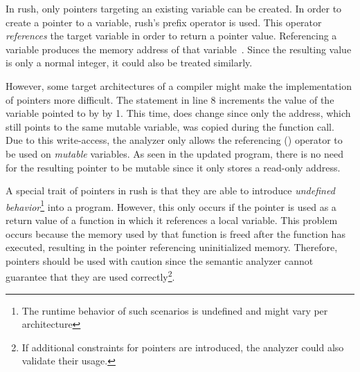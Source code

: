 In rush, only pointers targeting an existing variable can be created.
In order to create a pointer to a variable, rush's \qVerb{&} prefix operator is used.
This operator \emph{references} the target variable in order to return a pointer value.
Referencing a variable produces the memory address of that variable~\cite[p.~95]{Ritchie1988}.
Since the resulting value is only a normal integer, it could also be treated similarly.

However, some target architectures of a compiler might make the implementation of pointers more difficult.
The statement in line 8 increments the value of the variable pointed to by  by 1.
This time,  does change since only the address, which still points to the same mutable variable, was copied during the function call.
Due to this write-access, the analyzer only allows the referencing (\qVerb{&}) operator to be used on \emph{mutable} variables.
As seen in the updated program, there is no need for the resulting pointer to be mutable since it only stores a read-only address.

A special trait of pointers in rush is that they are able to introduce \emph{undefined behavior}\footnote{The runtime behavior of such scenarios is undefined and might vary per architecture} into a program.
However, this only occurs if the pointer is used as a return value of a function in which it references a local variable.
This problem occurs because the memory used by that function is freed after the function has executed, resulting in the pointer referencing uninitialized memory.
Therefore, pointers should be used with caution since the semantic analyzer cannot guarantee that they are used correctly\footnote{If additional constraints for pointers are introduced, the analyzer could also validate their usage.}.

